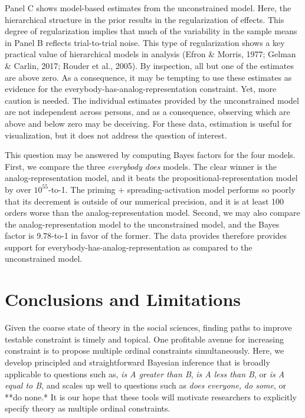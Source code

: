 \documentclass[english,,man]{apa6}
\begin{document}
Panel C shows model-based estimates from the unconstrained model. Here, the hierarchical structure in the prior results in the regularization of effects. This degree of regularization implies that much of the variability in the sample means in Panel B reflects trial-to-trial noise. This type of regularization shows a key practical value of hierarchical models in analysis (Efron \& Morris, 1977; Gelman \& Carlin, 2017; Rouder et al., 2005). By inspection, all but one of the estimates are above zero. As a consequence, it may be tempting to use these estimates as evidence for the everybody-has-analog-representation constraint. Yet, more caution is needed. The individual estimates provided by the unconstrained model are not independent across persons, and as a consequence, observing which are above and below zero may be deceiving. For these data, estimation is useful for visualization, but it does not address the question of interest.

This question may be answered by computing Bayes factors for the four models. First, we compare the three \emph{everybody does} models. The clear winner is the analog-representation model, and it beats the propositional-representation model by over \(10^{55}\)-to-1. The priming \(+\) spreading-activation model performs so poorly that its decrement is outside of our numerical precision, and it is at least 100 orders worse than the analog-representation model. Second, we may also compare the analog-representation model to the unconstrained model, and the Bayes factor is 9.78-to-1 in favor of the former. The data provides therefore provides support for everybody-has-analog-representation as compared to the unconstrained model.

\hypertarget{conclusions-and-limitations}{%
\section{Conclusions and Limitations}\label{conclusions-and-limitations}}

Given the coarse state of theory in the social sciences, finding paths to improve testable constraint is timely and topical. One profitable avenue for increasing constraint is to propose multiple ordinal constraints simultaneously. Here, we develop principled and straightforward Bayesian inference that is broadly applicable to questions such as, \emph{is A greater than B}, \emph{is A less than B}, or \emph{is A equal to B}, and scales up well to questions such as \emph{does everyone,} \emph{do some}, or **do none.* It is our hope that these tools will motivate researchers to explicitly specify theory as multiple ordinal constraints.
\end{document}
